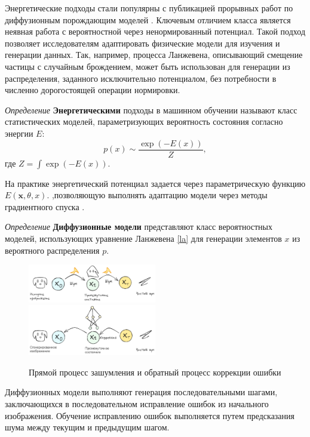 Энергетические подходы стали популярны с публикацией прорывных работ по диффузионным порождающим 
моделей \cite{song2020score}. Ключевым отличием класса является неявная работа с вероятностной
через ненормированный потенциал. Такой подход позволяет исследователям адаптировать
физические модели для изучения и генерации данных. Так, например, процесса Ланжевена, описывающий
смещение частицы с случайным брождением, может быть использован для генерации из распределения, заданного
исключительно потенциалом, без потребности в численно дорогостоящей операции нормировки.

\textit{Определение} \textbf{Энергетическими} подходы в машинном обучении 
называют класс статистических моделей, параметризующих вероятность 
состояния согласно энергии $E$:
\begin{equation}
    p(x) \sim \frac{\exp(-E(x))}{Z},
\end{equation}
где $Z=\int \exp(-E(x))$. 

На практике энергетический потенциал задается через параметрическую функцию $E(\mathbf{x},\theta,x)$.
,позволяющую выполнять адаптацию модели через методы градиентного спуска \cite{lecun2006tutorial}.

\textit{Определение} \textbf{Диффузионные модели} \label{diffusion} представляют класс вероятностных моделей, 
использующих уравнение Ланжевена \ref{la} для генерации элементов $x$ из вероятного распределения $p$.

\begin{figure}[h]
    \centering
    \includegraphics[width=0.5\textwidth]{assets/ml/generation/diffusion_1.excalidraw.png}
    \includegraphics[width=0.5\textwidth]{assets/ml/generation/diffusion_2.excalidraw.png}
    \caption{Прямой процесс зашумления и обратный процесс коррекции ошибки \cite{stablediffusion}}
    \label{sd_arch}
\end{figure}


Диффузионных модели выполняют генерация последовательными шагами, заключающихся 
в последовательном исправление ошибок из начального изображения. 
Обучение исправлению ошибок выполняется путем предсказания шума между текущим и предыдущим шагом.

